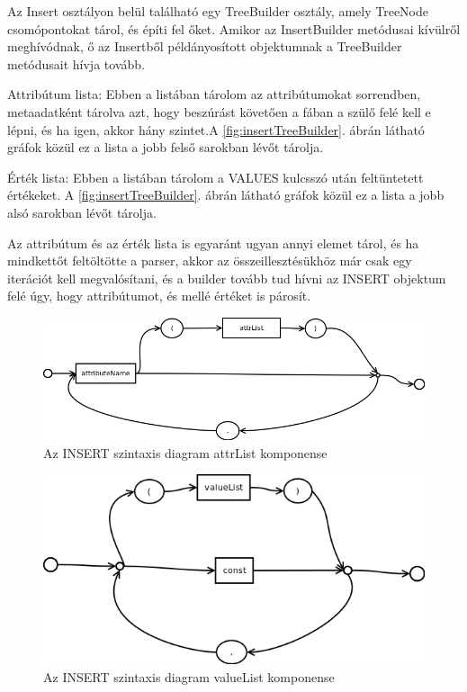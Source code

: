 Az Insert osztályon belül található egy TreeBuilder osztály, amely TreeNode csomópontokat tárol, és építi fel őket.
Amikor az InsertBuilder metódusai kívülről meghívódnak, ő az Insertből példányosított objektumnak a TreeBuilder metódusait hívja tovább.

Attribútum lista: Ebben a listában tárolom az attribútumokat sorrendben, metaadatként tárolva azt, hogy beszúrást követően a fában a szülő felé kell e lépni, és ha igen, akkor hány szintet.A \ref{fig:insertTreeBuilder}. ábrán látható gráfok közül ez a lista a jobb felső sarokban lévőt tárolja.

Érték lista: Ebben a listában tárolom a VALUES kulcsszó után feltüntetett értékeket. A \ref{fig:insertTreeBuilder}. ábrán látható gráfok közül ez a lista a jobb alsó sarokban lévőt tárolja.

Az attribútum és az érték lista is egyaránt ugyan annyi elemet tárol, és ha mindkettőt feltöltötte a parser, akkor az összeillesztésükhöz már csak egy iterációt kell megvalósítani, és a builder tovább tud hívni az INSERT objektum felé úgy, hogy attribútumot, és mellé értéket is párosít.

\begin{figure}[htb]
	\begin{center}
		\includegraphics[scale=0.4]{images/attrList}
		\caption{Az INSERT szintaxis diagram attrList komponense}
		\label{fig:attrListSytnax}
	\end{center}
\end{figure}

\begin{figure}[htb]
	\begin{center}
		\includegraphics[scale=0.4]{images/valueList}
		\caption{Az INSERT szintaxis diagram valueList komponense}
		\label{fig:valueListSytnax}
	\end{center}
\end{figure}

